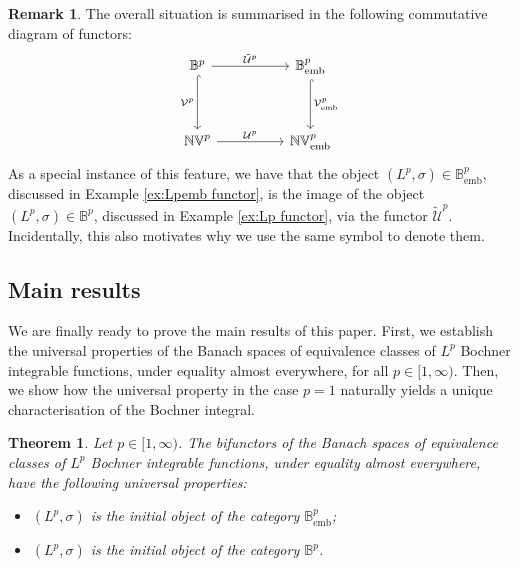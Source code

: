 \documentclass{amsart}
\theoremstyle{definition}
\newtheorem{remark}[definition]{Remark}
\theoremstyle{plain}
\newtheorem{theorem}[definition]{Theorem}
\newcommand{\NVembp}{\mathbb{NV}_{\mathrm{emb}}^p}
\newcommand{\NVp}{\mathbb{NV}^p}
\newcommand{\Bembp}{\mathbb{B}_{\mathrm{emb}}^p}
\newcommand{\Bp}{\mathbb{B}^p}
\begin{document}
\begin{remark}
            The overall situation is summarised in the following commutative diagram of functors:
            \begin{equation*}
                \begin{tikzcd}
                    \Bp \ar[rr, "\tilde{\mathcal{U}}^p"] \ar[dd, hook, "\mathcal{V}^p"']    &   & \Bembp \ar[dd, hook, "\mathcal{V}_{\mathrm{emb}}^p"] \\
                        &   & \\
                    \NVp \ar[rr, "\mathcal{U}^p"]     &   & \NVembp
                \end{tikzcd}
            \end{equation*}
            As a special instance of this feature, we have that the object $(L^p,\sigma) \in \Bembp$, discussed in Example \ref{ex:Lpemb functor}, is the image of the object $(L^p,\sigma) \in \Bp$, discussed in Example \ref{ex:Lp functor}, via the functor $\tilde{\mathcal{U}}^p$. 
            Incidentally, this also motivates why we use the same symbol to denote them.
        \end{remark}

    
    \subsection{Main results}
    \label{sec:main results}

        We are finally ready to prove the main results of this paper. 
        First, we establish the universal properties of the Banach spaces of equivalence classes of $L^p$ Bochner integrable functions, under equality almost everywhere, for all $p \in [1,\infty)$.
        Then, we show how the universal property in the case $p = 1$ naturally yields a unique characterisation of the Bochner integral.  
    
        \begin{theorem}
        \label{thm:universal properties of Bochner integrable functions}
            Let $p \in [1,\infty)$. The bifunctors of the Banach spaces of equivalence classes of $L^p$ Bochner integrable functions, under equality almost everywhere, have the following universal properties:
            \begin{itemize}
                \item[(i)] $(L^p,\sigma)$ is the initial object of the category $\Bembp$;
                \item[(ii)] $(L^p,\sigma)$ is the initial object of the category $\Bp$.
            \end{itemize}        
        \end{theorem}
        
\end{document}
